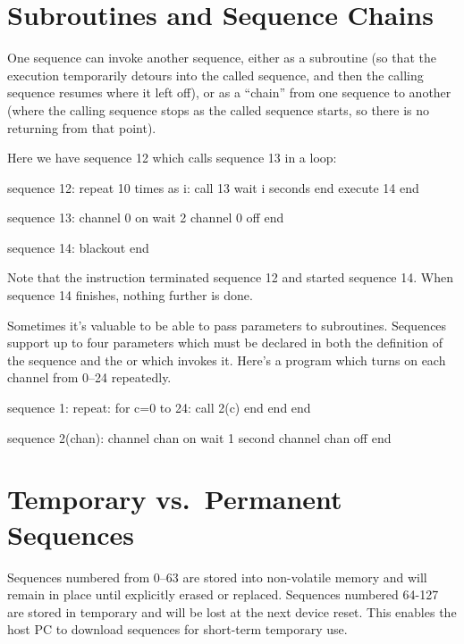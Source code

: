 \documentclass[letterpaper,twoside,onecolumn,openright,final]{memoir}
\begin{document}
{\section{Subroutines and Sequence Chains}
One sequence can invoke another sequence, either as a subroutine (so that the execution
temporarily detours into the called sequence, and then the calling sequence resumes where
it left off), or as a ``chain'' from one sequence to another (where the calling sequence 
stops as the called sequence starts, so there is no returning from that point).

Here we have sequence 12 which calls sequence 13 in a loop:
\begin{SourceCode}
sequence 12:
  repeat 10 times as i:
    call 13
    wait i seconds
  end
  execute 14
end

sequence 13:
  channel 0 on
  wait 2
  channel 0 off
end

sequence 14:
  blackout
end
\end{SourceCode}
Note that the  instruction terminated sequence 12 and started
sequence 14.  When sequence 14 finishes, nothing further is done.

Sometimes it's valuable to be able to pass parameters to subroutines.  Sequences support
up to four parameters which must be declared in both the definition of the sequence and
the  or  which invokes it.  Here's a program which turns on each channel
from 0--24 repeatedly.
\begin{SourceCode}
sequence 1:
  repeat:
    for c=0 to 24:
      call 2(c)
    end
  end
end

sequence 2(chan):
  channel chan on
  wait 1 second
  channel chan off
end
\end{SourceCode}
%

\section{Temporary vs.\ Permanent Sequences}
Sequences numbered from 0--63 are stored into non-volatile  memory and will remain
in place until explicitly erased or replaced.  Sequences numbered 64-127 are stored in temporary 
 and will be lost at the next device reset.  This enables the host PC to download
sequences for short-term temporary use.

}
\end{document}
